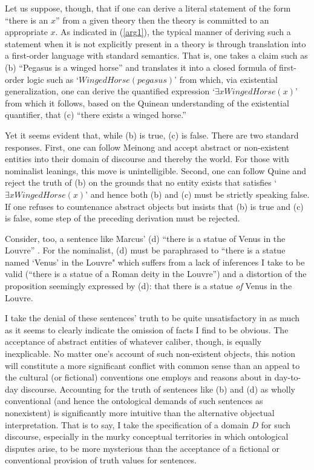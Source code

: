 \documentclass[12pt,a4paper]{article}
\begin{document}
Let us suppose, though, that if one can derive a literal statement of
the form ``there is an $x$'' from a given theory then the theory is
committed to an appropriate $x$.  As indicated in (\ref{arg1}), the
typical manner of deriving such a statement when it is not explicitly
present in a theory is through translation into a first-order language
with standard semantics.  That is, one takes a claim such as (b)
``Pegasus is a winged horse'' and translates it into a closed formula
of first-order logic such as `$WingedHorse(pegasus)$' from which, via
existential generalization, one can derive the quantified expression
`$\exists xWingedHorse(x)$' from which it follows, based on the
Quinean understanding of the existential quantifier, that (c) ``there
exists a winged horse.''

Yet it seems evident that, while (b) is true, (c) is false.  There are
two standard responses.  First, one can follow Meinong and accept
abstract or non-existent entities into their domain of discourse and
thereby the world.  For those with nominalist leanings, this move is
unintelligible.  Second, one can follow Quine and reject the truth of
(b) on the grounds that no entity exists that satisfies `$\exists
xWingedHorse(x)$' and hence both (b) and (c) must be strictly speaking
false.  If one refuses to countenance abstract objects but insists
that (b) is true and (c) is false, some step of the preceding
derivation must be rejected.

Consider, too, a sentence like Marcus' (d) ``there is a statue of
Venus in the Louvre'' \cite{marcus72}.  For the nominalist, (d) must
be paraphrased to ``there is a statue named `Venus' in the Louvre"
which suffers from a lack of inferences I take to be valid (``there is
a statue of a Roman deity in the Louvre'') and a distortion of the
proposition seemingly expressed by (d): that there is a statue
\emph{of} Venus in the Louvre.

I take the denial of these sentences' truth to be quite unsatisfactory
in as much as it seems to clearly indicate the omission of facts I
find to be obvious.  The acceptance of abstract entities of whatever
caliber, though, is equally inexplicable.  No matter one's account of
such non-existent objects, this notion will constitute a more
significant conflict with common sense than an appeal to the cultural
(or fictional) conventions one employs and reasons about in day-to-day
discourse. Accounting for the truth of sentences like (b) and (d) as
wholly conventional (and hence the ontological demands of such
sentences as nonexistent) is significantly more intuitive than the
alternative objectual interpretation.  That is to say, I take the
specification of a domain $D$ for such discourse, especially in the
murky conceptual territories in which ontological disputes arise, to
be more mysterious than the acceptance of a fictional or conventional
provision of truth values for sentences.
\end{document}
